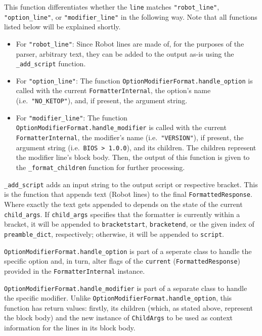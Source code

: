 This function differentiates whether the \verb|line| matches \verb|"robot_line"|, \verb|"option_line"|, or \verb|"modifier_line"| in the following way. Note that all functions listed below will be explained shortly. 

\begin{itemize}
    \item For \verb|"robot_line"|: Since Robot lines are made of, for the purposes of the parser, arbitrary text, they can be added to the output as-is using the \verb|_add_script| function.
    \item For \verb|"option_line"|: The function \verb|OptionModifierFormat.handle_option| is called with the current \verb|FormatterInternal|, the option's name (i.e.\ \verb|"NO_KETOP"|), and, if present, the argument string.
    \item For \verb|"modifier_line"|: The function \verb|OptionModifierFormat.handle_modifier| is called with the current \verb|FormatterInternal|, the modifier's name (i.e.\ \verb|"VERSION"|), if present, the argument string (i.e.\ \verb|BIOS > 1.0.0|), and its children. The children represent the modifier line's block body. Then, the output of this function is given to the \verb|_format_children| function for further processing.
\end{itemize}

\verb|_add_script| adds an input string to the output script or respective bracket. This is the function that appends text (Robot lines) to the final \verb|FormattedResponse|. Where exactly the text gets appended to depends on the state of the current \verb|child_args|. If \verb|child_args| specifies that the formatter is currently within a bracket, it will be appended to \verb|bracketstart|, \verb|bracketend|, or the given index of \verb|preamble_dict|, respectively; otherwise, it will be appended to \verb|script|.

\verb|OptionModifierFormat.handle_option| is part of a seperate class to handle the specific option and, in turn, alter flags of the \verb|current| (\verb|FormattedResponse|) provided in the \verb|FormatterInternal| instance. 

\verb|OptionModifierFormat.handle_modifier| is part of a separate class to handle the specific modifier. Unlike \verb|OptionModifierFormat.handle_option|, this function has return values: firstly, its children (which, as stated above, represent the block body) and the new instance of \verb|ChildArgs| to be used as context information for the lines in its block body. 

